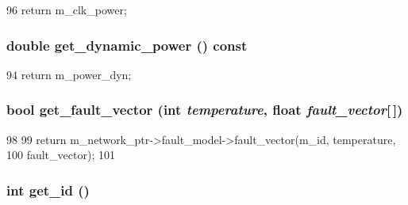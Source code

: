 \begin{DoxyCode}
96 { return m_clk_power; }
\end{DoxyCode}
\hypertarget{classRouter__d_a10bdb0a8b5af73052370b12b1045bd10}{
\subsubsection[{get\_\-dynamic\_\-power}]{\setlength{\rightskip}{0pt plus 5cm}double get\_\-dynamic\_\-power () const}}
\label{classRouter__d_a10bdb0a8b5af73052370b12b1045bd10}



\begin{DoxyCode}
94 { return m_power_dyn; }
\end{DoxyCode}
\hypertarget{classRouter__d_a28444a3dd905780dae59ba987649d06e}{
\subsubsection[{get\_\-fault\_\-vector}]{\setlength{\rightskip}{0pt plus 5cm}bool get\_\-fault\_\-vector (int {\em temperature}, \/  float {\em fault\_\-vector}\mbox{[}$\,$\mbox{]})}}
\label{classRouter__d_a28444a3dd905780dae59ba987649d06e}



\begin{DoxyCode}
98                                                                 { 
99         return m_network_ptr->fault_model->fault_vector(m_id, temperature, 
100                                                         fault_vector); 
101     }
\end{DoxyCode}
\hypertarget{classRouter__d_a1f0b8f09abd10342468ce33a1da15557}{
\subsubsection[{get\_\-id}]{\setlength{\rightskip}{0pt plus 5cm}int get\_\-id ()}}
\label{classRouter__d_a1f0b8f09abd10342468ce33a1da15557}



